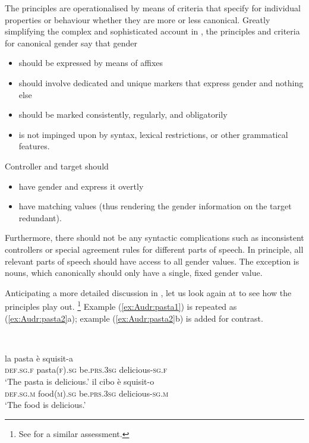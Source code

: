 \documentclass[output=collectionpaper]{langsci/langscibook}
\begin{document}
The principles are operationalised by means of criteria that specify for individual properties or behaviour whether they are more or less canonical. Greatly simplifying the complex and sophisticated account in \citet{Corbett2016}, the principles and criteria for canonical gender say that gender

\begin{itemize}
\item
should be expressed by means of affixes

\item
should involve dedicated and unique markers that express gender and nothing else

\item
should be marked consistently, regularly, and obligatorily

\item
is not impinged upon by syntax, lexical restrictions, or other grammatical features.
\end{itemize}

Controller and target should

\begin{itemize}
\item
have gender and express it overtly

\item
have matching values (thus rendering the gender information on the target redundant).
\end{itemize}

Furthermore, there should not be any syntactic complications such as inconsistent controllers or special agreement rules for different parts of speech. In principle, all relevant parts of speech should have access to all gender values. The exception is nouns, which \textendash{} canonically \textendash{} should only have a single, fixed gender value.

Anticipating a more detailed discussion in , let us look again at  to see how the principles play out.%
\footnote{See \citet[3]{Fedden2017} for a similar assessment.} %
Example (\ref{ex:Audr:pasta1}) is repeated as (\ref{ex:Audr:pasta2}a); example (\ref{ex:Audr:pasta2}b) is added for contrast.

\ea
\label{ex:Audr:pasta2}
\\
\begin{xlist}
\ex
\gll la pasta è squisit-a          \\
     \textsc{def.sg.f} pasta\textsc{(f).sg} be.\textsc{prs.3sg} delicious-\textsc{sg.f}\\
\glt `The pasta is delicious.'
\ex
\gll il cibo è squisit-o          \\
     \textsc{def.sg.m} food\textsc{(m).sg} be.\textsc{prs.3sg} delicious-\textsc{sg.m}\\
\glt `The food is delicious.'
\end{xlist}
\z
\end{document}
